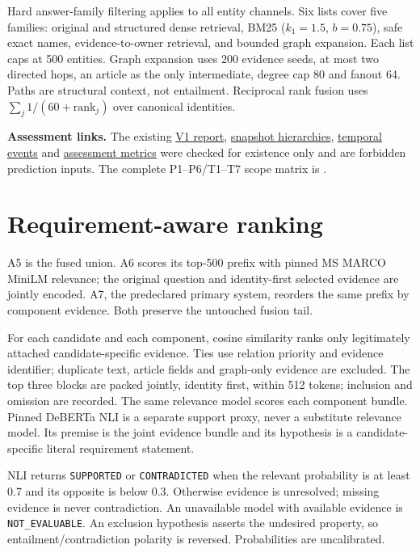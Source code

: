 \documentclass[11pt,a4paper]{article}
\begin{document}
Hard answer-family filtering applies to all entity channels. Six lists cover five families: original and structured dense retrieval, BM25 ($k_1=1.5$, $b=0.75$), safe exact names, evidence-to-owner retrieval, and bounded graph expansion. Each list caps at 500 entities. Graph expansion uses 200 evidence seeds, at most two directed hops, an article as the only intermediate, degree cap 80 and fanout 64. Paths are structural context, not entailment. Reciprocal rank fusion uses $\sum_j 1/(60+\mathrm{rank}_j)$ over canonical identities.

\textbf{Assessment links.} The existing \href{../../clean_tshc/report.md}{V1 report}, \href{../../clean_tshc/outputs/hierarchies/}{snapshot hierarchies}, \href{../../clean_tshc/outputs/temporal_events.json}{temporal events} and \href{../../clean_tshc/outputs/metrics.json}{assessment metrics} were checked for existence only and are forbidden prediction inputs. The complete P1--P6/T1--T7 scope matrix is .

\newpage
\section*{Requirement-aware ranking}
A5 is the fused union. A6 scores its top-500 prefix with pinned MS MARCO MiniLM relevance; the original question and identity-first selected evidence are jointly encoded. A7, the predeclared primary system, reorders the same prefix by component evidence. Both preserve the untouched fusion tail.

For each candidate and each component, cosine similarity ranks only legitimately attached candidate-specific evidence. Ties use relation priority and evidence identifier; duplicate text, article fields and graph-only evidence are excluded. The top three blocks are packed jointly, identity first, within 512 tokens; inclusion and omission are recorded. The same relevance model scores each component bundle. Pinned DeBERTa NLI is a separate support proxy, never a substitute relevance model. Its premise is the joint evidence bundle and its hypothesis is a candidate-specific literal requirement statement.

NLI returns \texttt{SUPPORTED} or \texttt{CONTRADICTED} when the relevant probability is at least 0.7 and its opposite is below 0.3. Otherwise evidence is unresolved; missing evidence is never contradiction. An unavailable model with available evidence is \texttt{NOT\_EVALUABLE}. An exclusion hypothesis asserts the undesired property, so entailment/contradiction polarity is reversed. Probabilities are uncalibrated.
\end{document}
